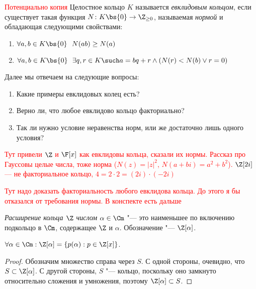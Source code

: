 \begin{definition} \textcolor{red}{Потенциально копия}
	Целостное кольцо $K$ называется \textit{евклидовым кольцом}, если существует такая функция $N \colon K \bs \{0\} \to \Z_{\ge 0}$, называемая \textit{нормой} и обладающая следующими свойствами:
	\begin{enumerate}
		\item $\forall a, b \in K \bs \{0\}\ \ N(ab) \ge N(a)$
		
		\item $\forall a, b \in K \bs \{0\}\ \ \exists q, r \in K \such a = bq + r \wedge (N(r) < N(b) \vee r = 0)$
	\end{enumerate}
\end{definition}

\begin{note}
	Далее мы отвечаем на следующие вопросы:
	\begin{enumerate}
		\item Какие примеры евклидовых колец есть?
		
		\item Верно ли, что любое евклидово кольцо факториально?
		
		\item Так ли нужно условие неравенства норм, или же достаточно лишь одного условия?
	\end{enumerate}
\end{note}

\textcolor{red}{Тут привели $\Z$ и $\F[x]$ как евклидовы кольца, сказали их нормы. Рассказ про Гауссовы целые числа, тоже норма ($N(z) = |z|^2$, $N(a + bi) = a^2 + b^2$). $\Z[2i]$ --- не факториальное кольцо, $4 = 2 \cdot 2 = (2i) \cdot (-2i)$}

\textcolor{red}{Тут надо доказать факториальность любого евклидова кольца. До этого я бы отказался от требования нормы. В конспекте есть дальше}

\begin{definition}
	\textit{Расширение кольца $\Z$ числом $\alpha \in \Cm$} "--- это наименьшее по включению подкольцо в $\Cm$, содержащее $\Z$ и $\alpha$. Обозначение "--- $\Z[\alpha]$.
\end{definition}

\begin{proposition}
	$\forall \alpha \in \Cm: \Z[\alpha] = \{p(\alpha): p \in \Z[x]\}$.
\end{proposition}

\begin{proof}
	Обозначим множество справа через $S$. С одной стороны, очевидно, что $S \subset \Z[\alpha]$. С другой стороны, $S$ "--- кольцо, поскольку оно замкнуто относительно сложения и умножения, поэтому $\Z[\alpha] \subset S$.
\end{proof}

